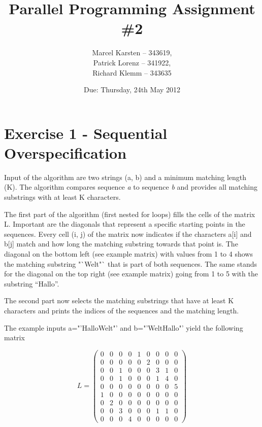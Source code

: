 \documentclass[a4paper,twoside,11pt]{article}
\begin{document}
\pagestyle{fancyplain}

\title{Parallel Programming Assignment \#2} 
\author{Marcel Karsten -- 343619,\\ Patrick Lorenz -- 341922,\\ Richard Klemm -- 343635 }
\date{Due: Thursday, 24th May 2012} %
\maketitle

\lhead{}
\renewcommand{\headrulewidth}{0px}



\section{Exercise 1 - Sequential Overspecification}
Input of the algorithm are two strings (a, b) and a minimum matching length (K). The algorithm compares sequence \textit{a} to sequence \textit{b} and provides all matching substrings with at least K characters.

The first part of the algorithm (first nested for loops) fills the cells of the matrix L. Important are the diagonals that represent a specific starting points in the sequences. Every cell (i, j) of the matrix now indicates if the characters a[i] and b[j] match and how long the matching substring towards that point is. The diagonal on the bottom left (see example matrix) with values from 1 to 4 shows the matching substring "`Welt"` that is part of both sequences. The same stands for the diagonal on the top right (see example matrix) going from 1 to 5 with the substring "`Hallo"'.

The second part now selects the matching substrings that have at least K characters and prints the indices of the sequences and the matching length.


The example inputs a="'HalloWelt"' and b="'WeltHallo"' yield the following matrix 

$$L=
\begin{pmatrix}
	0 & 0 & 0 & 0 & 1 & 0 & 0 & 0 & 0 \\
	0 & 0 & 0 & 0 & 0 & 2 & 0 & 0 & 0 \\
	0 & 0 & 1 & 0 & 0 & 0 & 3 & 1 & 0 \\
	0 & 0 & 1 & 0 & 0 & 0 & 1 & 4 & 0 \\
	0 & 0 & 0 & 0 & 0 & 0 & 0 & 0 & 5 \\
	1 & 0 & 0 & 0 & 0 & 0 & 0 & 0 & 0 \\
	0 & 2 & 0 & 0 & 0 & 0 & 0 & 0 & 0 \\
	0 & 0 & 3 & 0 & 0 & 0 & 1 & 1 & 0 \\
	0 & 0 & 0 & 4 & 0 & 0 & 0 & 0 & 0
\end{pmatrix}
$$
\end{document}
